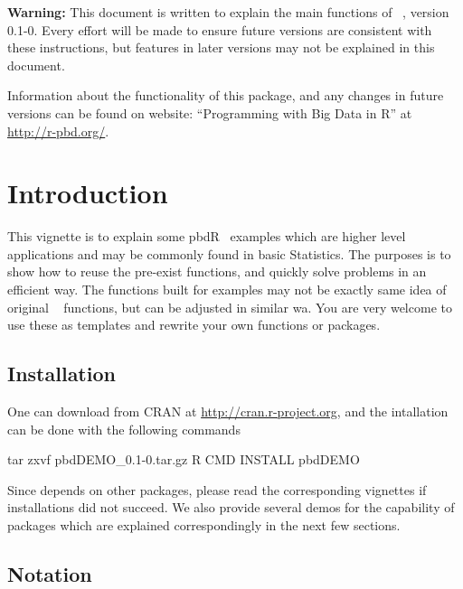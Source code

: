 
{\color{red} \bf Warning:} This document is written to explain the main
functions of ~\citep{Schmidt2012pbdDEMOpackage}, version 0.1-0.
Every effort will be made to ensure future versions are consistent with
these instructions, but features in later versions may not be explained
in this document.

Information about the functionality of this package,
and any changes in future versions can be found on website:
``Programming with Big Data in R'' at
\url{http://r-pbd.org/}.


\section[Introduction]{Introduction}
\label{sec:introduction}

This vignette is to explain some pbdR~\citep{pbdR2012}
examples which are higher level
applications and may be commonly found in basic Statistics.
The purposes is to show how to reuse the pre-exist functions, and
quickly solve problems in an efficient way.
The functions built for examples may not be exactly same idea of original
~\citep{Rcore}
functions, but can be adjusted in similar wa.
You are very welcome to use these as templates and rewrite your own functions
or packages.


\subsection[Installation]{Installation}
\label{sec:installation}

One can download  from CRAN at
\url{http://cran.r-project.org}, and
the intallation can be done with the following commands
\begin{Command}
tar zxvf pbdDEMO_0.1-0.tar.gz
R CMD INSTALL pbdDEMO
\end{Command}
Since  depends on other  packages,
please read the corresponding vignettes if installations did
not succeed.
We also provide several demos for the capability of 
packages which are explained correspondingly in the next few sections.


\subsection[Notation]{Notation}
\label{sec:notation}

